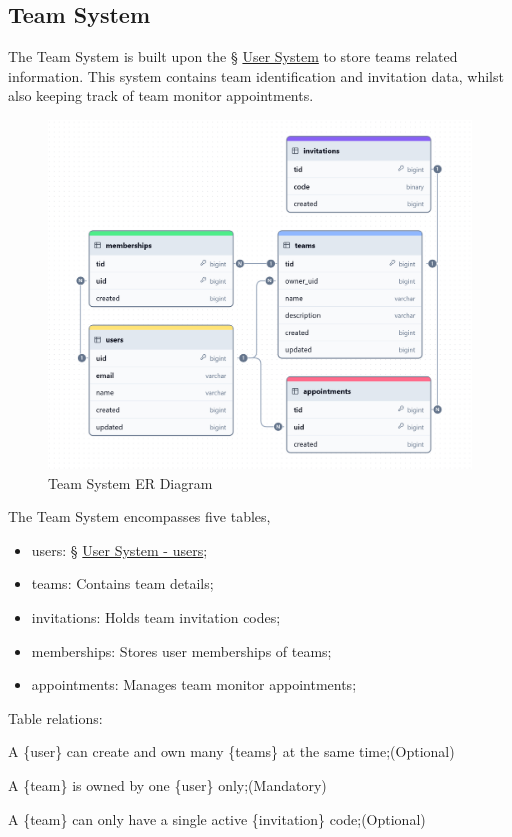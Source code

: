 \documentclass[12pt]{report}
\newcommand{\n}{\par}
\newcommand{\br}{\n\vspace{1 em}\n}
\begin{document}
\subsection{Team System} \label{data-layer.design.team-system}
The Team System is built upon the \S{} \hyperref[data-layer.design.user-system]{User System} to store teams related information.
This system contains team identification and invitation data,
whilst also keeping track of team monitor appointments.
\br
\begin{figure}[ht!]
	\centering
	\includegraphics[width=1\linewidth]{assets/data-layer/team_system.jpeg}
	\caption{Team System ER Diagram}
	\label{fig:team-system-er}
\end{figure}
\br
The Team System encompasses five tables,
\begin{itemize}
	\item users: \S{} \hyperref[data-layer.design.user-system.users]{User System - users};
	\item teams: Contains team details;
	\item invitations: Holds team invitation codes;
	\item memberships: Stores user memberships of teams;
	\item appointments: Manages team monitor appointments;
\end{itemize}
\br
Table relations:\n
A \{user\} can create and own many \{teams\} at the same time;\null\hfill (Optional)\n
A \{team\} is owned by one \{user\} only;\null\hfill (Mandatory)
\br
A \{team\} can only have a single active \{invitation\} code;\null\hfill (Optional)\n
\end{document}
